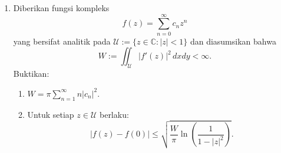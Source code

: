 \documentclass[12pt,twoside]{article}
\newenvironment{solution}
{
	\par\noindent\textbf{\underline{Solusi.}}\\
}
{
	\par
}
\begin{document}
\begin{enumerate}
\begin{solution}
          Sekarang kita hitung dengan cara lain dengan mengklasifikasikan himpunan $S$ berdasarkan elemen median-nya (elemen ke-$(k+1)$ terkecil).
          Misalkan elemen-elemen $S$ diurutkan sebagai $x_1 < x_2 < \dots < x_{2k+1}$.
          Elemen tengahnya adalah $x_{k+1}$. Misalkan $x_{k+1} = m+1$.
          Agar $m+1$ menjadi elemen ke-$(k+1)$, haruslah terdapat:
          \begin{itemize}
            \item Tepat $k$ elemen yang lebih kecil dari $m+1$. Elemen-elemen ini harus dipilih dari $\{1, 2, \dots, m\}$. Banyaknya cara memilih $k$ elemen dari $m$ elemen adalah $\binom{m}{k}$.
            \item Tepat $k$ elemen yang lebih besar dari $m+1$. Elemen-elemen ini harus dipilih dari $\{m+2, m+3, \dots, n+1\}$. Banyaknya elemen yang tersedia adalah $(n+1) - (m+1) = n - m$. Banyaknya cara memilih $k$ elemen dari $n-m$ elemen adalah $\binom{n-m}{k}$.
          \end{itemize}
          Nilai $m$ yang mungkin:
          \begin{itemize}
            \item Nilai terkecil $x_{k+1}$ terjadi jika $k$ elemen terkecil dipilih ($1, \dots, k$), sehingga $x_{k+1} = k+1 \implies m=k$.
            \item Nilai terbesar $x_{k+1}$ terjadi jika $k$ elemen terbesar dipilih, sehingga $x_{k+1} = (n+1)-k \implies m=n-k$.
          \end{itemize}
          Total banyaknya cara adalah jumlah dari semua kemungkinan nilai $m$:
          \[ \sum_{m=k}^{n-k} \binom{m}{k} \binom{n - m}{k}. \]
          Ini adalah ruas kiri persamaan. Karena kedua ruas menghitung objek yang sama, maka identitas terbukti.
        \end{solution}

  \item Diberikan fungsi kompleks
        \[
          f(z) = \sum_{n=0}^{\infty} c_n z^n
        \]
        yang bersifat analitik pada $\mathcal{U} := \{ z \in \mathbb{C} : |z| < 1 \}$ dan diasumsikan bahwa
        \[
          W := \iint_{\mathcal{U}} |f'(z)|^2 \, dxdy < \infty.
        \]
        Buktikan:
        \begin{enumerate}
          \item
                \(
                W = \pi \sum_{n=1}^{\infty} n |c_n|^2.
                \)
          \item Untuk setiap $z \in \mathcal{U}$ berlaku:
                \[
                  |f(z) - f(0)| \leq \sqrt{ \frac{W}{\pi} \ln\left( \frac{1}{1 - |z|^2} \right) }.
                \]
        \end{enumerate}


\end{enumerate}
\end{document}

